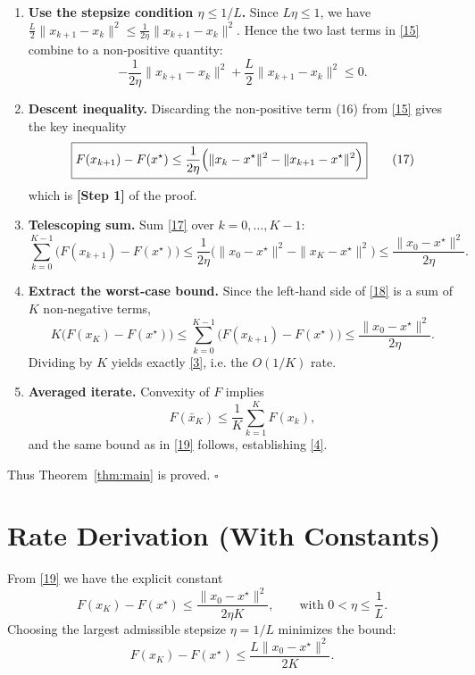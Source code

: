 \documentclass{article}
\begin{document}
\begin{enumerate}
\[    -\|x_{k+1}-x_{k}\|^{2}.
\tag{14}
\]
Dividing \eqref{14} by $2\eta$ and inserting into \eqref{13} yields
\[
\begin{aligned}
F(x_{k+1})-F(x^{\star})
&\le \frac{1}{2\eta}\bigl(\|x_{k}-x^{\star}\|^{2}
          -\|x_{k+1}-x^{\star}\|^{2}
          -\|x_{k+1}-x_{k}\|^{2}\bigr)
   +\frac{L}{2}\|x_{k+1}-x_{k}\|^{2}.
\end{aligned}
\tag{15}
\]
\item \textbf{Use the stepsize condition $\eta\le 1/L$.}  
Since $L\eta\le1$, we have $ \frac{L}{2}\|x_{k+1}-x_{k}\|^{2}\le\frac{1}{2\eta}\|x_{k+1}-x_{k}\|^{2}$.  
Hence the two last terms in \eqref{15} combine to a non‑positive quantity:
\[
-\frac{1}{2\eta}\|x_{k+1}-x_{k}\|^{2}
   +\frac{L}{2}\|x_{k+1}-x_{k}\|^{2}
   \le 0.
\tag{16}
\]
\item \textbf{Descent inequality.}  
Discarding the non‑positive term (16) from \eqref{15} gives the key inequality
\[
\boxed{%
F(x_{k+1})-F(x^{\star})
\le \frac{1}{2\eta}\Bigl(\|x_{k}-x^{\star}\|^{2}
                         -\|x_{k+1}-x^{\star}\|^{2}\Bigr)
}
\tag{17}
\]
which is \textbf{[Step 1]} of the proof.
\item \textbf{Telescoping sum.}  
Sum \eqref{17} over $k=0,\dots,K-1$:
\[
\sum_{k=0}^{K-1}\!\bigl(F(x_{k+1})-F(x^{\star})\bigr)
\le \frac{1}{2\eta}\bigl(\|x_{0}-x^{\star}\|^{2}
                         -\|x_{K}-x^{\star}\|^{2}\bigr)
\le \frac{\|x_{0}-x^{\star}\|^{2}}{2\eta}.
\tag{18}
\]
\item \textbf{Extract the worst‑case bound.}  
Since the left‑hand side of \eqref{18} is a sum of $K$ non‑negative terms,
\[
K\bigl(F(x_{K})-F(x^{\star})\bigr)
\le \sum_{k=0}^{K-1}\!\bigl(F(x_{k+1})-F(x^{\star})\bigr)
\le \frac{\|x_{0}-x^{\star}\|^{2}}{2\eta}.
\tag{19}
\]
Dividing by $K$ yields exactly \eqref{3}, i.e. the $O(1/K)$ rate.
\item \textbf{Averaged iterate.}  
Convexity of $F$ implies
\[
F(\bar{x}_{K})\le\frac{1}{K}\sum_{k=1}^{K}F(x_{k}),
\]
and the same bound as in \eqref{19} follows, establishing \eqref{4}.
\end{enumerate}
Thus Theorem~\ref{thm:main} is proved. $\square$

\section*{Rate Derivation (With Constants)}
From \eqref{19} we have the explicit constant
\[
F(x_{K})-F(x^{\star})\le
\frac{\|x_{0}-x^{\star}\|^{2}}{2\eta K},
\qquad
\text{with }0<\eta\le\frac{1}{L}.
\]
Choosing the largest admissible stepsize $\eta=1/L$ minimizes the bound:
\[
F(x_{K})-F(x^{\star})\le\frac{L\|x_{0}-x^{\star}\|^{2}}{2K}.
\tag{20}
\]
\end{document}
